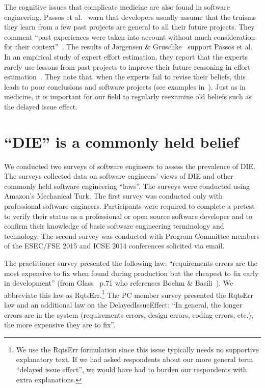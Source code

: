 \documentclass[smallcondensed]{svjour3}
\begin{document}
The cognitive issues that complicate medicine are also found in software engineering.
Passos et al.~\cite{passos11} warn that developers
usually assume that the truisms they learn from a few past
projects are general to 
all their future projects. They comment ``past experiences were taken into account without 
much consideration for their context''~\cite{passos11}.
The results of J{\o}rgensen \& Gruschke~\cite{jorgensen09} support Passos et al. In an empirical study of expert effort estimation, they report that the experts rarely use lessons
  from past projects to improve their future reasoning in effort estimation~\cite{jorgensen09}. 
 They note that,
when the experts
  fail to revise their beliefs, this leads to poor
 conclusions and software projects  (see examples in~\cite{jorgensen09}).
Just as in medicine, 
 it is important for our field
 to regularly  reexamine    old beliefs such as the delayed issue effect.
  
 
 
\section{``DIE'' is a  commonly held belief}
\label{sect:belief}





We conducted two surveys of software engineers to assess the prevalence of DIE. 
The surveys collected data on software engineers' views of DIE and other commonly held software engineering ``laws''. The surveys were conducted using Amazon's Mechanical Turk. The first survey was conducted only with professional software engineers. Participants were required to complete a pretest to verify their status as a professional or open source software developer and to confirm their knowledge of basic software engineering terminology and technology. The  second survey was conducted with Program Committee members of the ESEC/FSE 2015 and ICSE 2014 conferences solicited via email.

The practitioner survey presented the following law: ``requirements errors are the most expensive to fix when found during production but the cheapest to fix early in development'' (from Glass~\cite{glass02} p.71 who references Boehm \& Basili~\cite{boehm01}). We abbreviate this law as RqtsErr.\footnote{We use the RqtsErr formulation since this issue typically needs no supportive explanatory
text. If we had asked respondents about our more general term ``delayed issue
effect'', we would have had to burden our respondents with extra explanations.}
The PC member survey presented the RqtsErr law and an additional law on the DelayedIssueEffect: ``In general, the longer errors are in the system (requirements errors, design errors, coding errors, etc.), the more expensive they are to fix''. 
\end{document}
